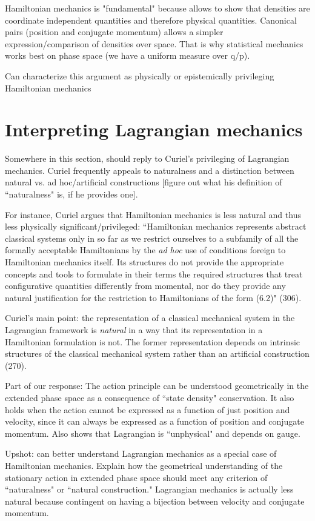 \documentclass[letterpaper]{article}
\begin{document}
Hamiltonian mechanics is "fundamental" because allows to show that densities are coordinate independent quantities and therefore physical quantities. Canonical pairs (position and conjugate momentum) allows a simpler expression/comparison of densities over space. That is why statistical mechanics works best on phase space (we have a uniform measure over q/p).

Can characterize this argument as physically or epistemically privileging Hamiltonian mechanics 

\section{Interpreting Lagrangian mechanics}

Somewhere in this section, should reply to Curiel's privileging of Lagrangian mechanics. Curiel frequently appeals to naturalness and a distinction between natural vs. ad hoc/artificial constructions [figure out what his definition of ``naturalness" is, if he provides one].

For instance, Curiel argues that Hamiltonian mechanics is less natural and thus less physically significant/privileged:  ``Hamiltonian mechanics represents abstract classical systems only in so far as we restrict ourselves to a subfamily of all the formally acceptable Hamiltonians by the \textit{ad hoc} use of conditions foreign to Hamiltonian mechanics itself. Its structures do not provide the appropriate concepts and tools to formulate in their terms the required structures that treat configurative quantities differently from momental, nor do they provide any natural justification for the restriction to Hamiltonians of the form (6.2)" (306). 

Curiel's main point: the representation of a classical mechanical system in the Lagrangian framework is \textit{natural} in a way that its representation in a Hamiltonian formulation is not. The former representation depends on intrinsic structures of the classical mechanical system rather than an artificial construction (270).

Part of our response: The action principle can be understood geometrically in the extended phase space as a consequence of ``state density" conservation. It also holds when the action cannot be expressed as a function of just position and velocity, since it can always be expressed as a function of position and conjugate momentum. Also shows that Lagrangian is ``unphysical" and depends on gauge.


Upshot: can better understand Lagrangian mechanics as a special case of Hamiltonian mechanics. Explain how the geometrical understanding of the stationary action in extended phase space should meet any criterion of ``naturalness" or ``natural construction." Lagrangian mechanics is actually less natural because contingent on having a bijection between velocity and conjugate momentum.

%


\end{document}
